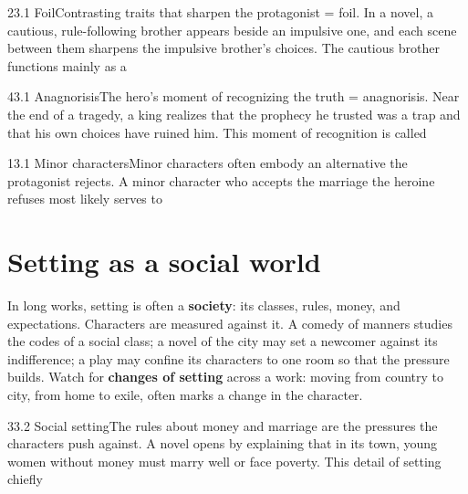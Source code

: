 \documentclass[11pt]{article}
\begin{document}
\begin{q}{2}{3.1 Foil}{Contrasting traits that sharpen the protagonist = foil.}
In a novel, a cautious, rule-following brother appears beside an impulsive one, and each scene between them sharpens the impulsive brother's choices. The cautious brother functions mainly as a
\end{q}

\begin{q}{4}{3.1 Anagnorisis}{The hero's moment of recognizing the truth = anagnorisis.}
Near the end of a tragedy, a king realizes that the prophecy he trusted was a trap and that his own choices have ruined him. This moment of recognition is called
\end{q}

\begin{q}{1}{3.1 Minor characters}{Minor characters often embody an alternative the protagonist rejects.}
A minor character who accepts the marriage the heroine refuses most likely serves to
\end{q}

\section{Setting as a social world}
\label{sec:2}

In long works, setting is often a \textbf{society}: its classes, rules, money, and expectations. Characters are measured against it. A comedy of manners studies the codes of a social class; a novel of the city may set a newcomer against its indifference; a play may confine its characters to one room so that the pressure builds. Watch for \textbf{changes of setting} across a work: moving from country to city, from home to exile, often marks a change in the character.

\begin{q}{3}{3.2 Social setting}{The rules about money and marriage are the pressures the characters push against.}
A novel opens by explaining that in its town, young women without money must marry well or face poverty. This detail of setting chiefly
\end{q}
\end{document}
